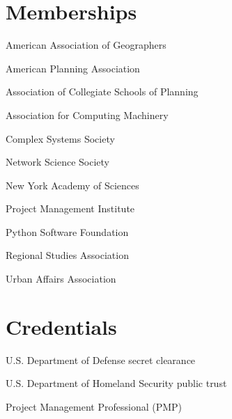 \documentclass[12pt,letterpaper]{report}
\newcommand{\listitemspace}{0.25em}
\renewenvironment{itemize}
{\begin{list}{}{\setlength{\leftmargin}{0em}
            \setlength{\parskip}{0em}
            \setlength{\itemsep}{\listitemspace}
            \setlength{\parsep}{\listitemspace}}}
{\end{list}}
\begin{document}
    \section*{Memberships}

    \begin{itemize}

        \item American Association of Geographers

        \item American Planning Association

        \item Association of Collegiate Schools of Planning

        \item Association for Computing Machinery

        \item Complex Systems Society

        \item Network Science Society

        \item New York Academy of Sciences

        \item Project Management Institute

        \item Python Software Foundation

        \item Regional Studies Association

        \item Urban Affairs Association

    \end{itemize}



    \section*{Credentials}

    \begin{itemize}

        \item U.S. Department of Defense secret clearance

        \item U.S. Department of Homeland Security public trust

        \item Project Management Professional (PMP)

    \end{itemize}
\end{document}
